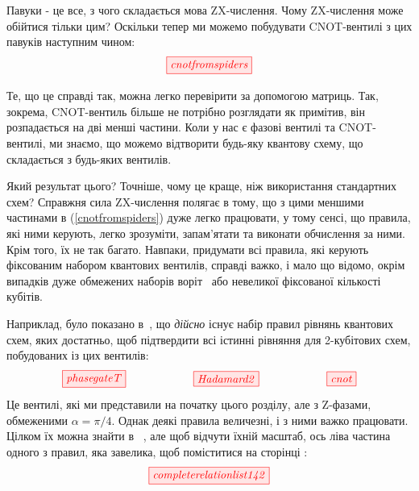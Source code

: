 \documentclass[11pt]{article}
\theoremstyle{definition}
\newcommand{\beq}{\begin{equation}}
\newcommand{\eeq}{\end{equation}\par\noindent}
\begin{document}
Павуки - це все, з чого складається мова ZX-числення. Чому ZX-числення може обійтися тільки цим?
Оскільки тепер ми можемо побудувати CNOT-вентилі з цих павуків наступним чином:
\beq\label{cnotfromspiders}
\tikzfig{cnotfromspiders}
\eeq
Те, що це справді так, можна легко перевірити за допомогою матриць. Так, зокрема, CNOT-вентиль більше не потрібно розглядати як примітив, він розпадається на дві менші частини. Коли у нас є фазові вентилі та CNOT-вентилі, ми знаємо, що можемо відтворити будь-яку квантову схему, що складається з будь-яких вентилів.

Який результат цього? Точніше, чому це краще, ніж використання стандартних схем?
Справжня сила ZX-числення полягає в тому, що з цими меншими частинами в (\ref{cnotfromspiders}) дуже легко працювати, у тому сенсі, що правила, які ними керують, легко зрозуміти, запам’ятати та виконати обчислення за ними. Крім того, їх не так багато. Навпаки, придумати всі правила, які керують фіксованим набором квантових вентилів, справді важко, і мало що відомо, окрім випадків дуже обмежених наборів воріт~\cite{cnotdihedral} або невеликої фіксованої кількості кубітів.

Наприклад, було показано в~\cite{ptbian}, що \textit{дійсно} існує набір правил рівнянь квантових схем, яких достатньо, щоб підтвердити всі істинні рівняння для 2-кубітових схем, побудованих із цих вентилів:
\[
\tikzfig{phasegateT}\qquad\qquad\qquad\tikzfig{Hadamard2}\qquad\qquad\qquad\tikzfig{cnot}  
\]
Це вентилі, які ми представили на початку цього розділу, але з Z-фазами, обмеженими $\alpha = \pi/4$.
Однак деякі правила величезні, і з ними важко працювати. Цілком їх можна знайти в ~\cite{DBLP:conf/rc/CoeckeW18}, але щоб відчути їхній масштаб, ось ліва частина одного з правил, яка завелика, щоб поміститися на сторінці :
\beq\label{circ:completerelationlist142}
\tikzfig{completerelationlist142} 
\eeq


\end{document}
